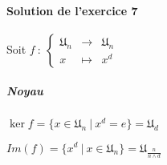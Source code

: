 \documentclass[]{article}
\theoremstyle{remark}
\theoremstyle{definition}
\newcommand{\func}[5]{
#1 ~ : ~ \left\{ \begin{array}{lcl}
	#2 & \longrightarrow & #3 \\
	#4 & \longmapsto & #5
\end{array}
\right.
}
\begin{document}
\paragraph{Solution de l'exercice 7}

Soit $\func{f}{\mathfrak{U}_n}{\mathfrak{U}_n}{x}{x^d}$

\subparagraph{Noyau}

$\ker f = \{x \in \mathfrak{U}_n ~ | ~ x^d = e \} = \mathfrak{U}_d$

$Im(f)=\{x^d ~|~ x \in \mathfrak{U}_n\}=\mathfrak{U}_{\frac{n}{n \land d}}$
\end{document}
